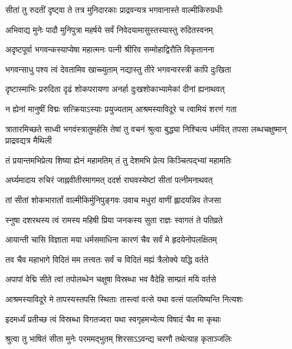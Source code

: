 
\twolineshloka
{सीतां तु रुदतीं दृष्ट्वा ते तत्र मुनिदारकाः}
{प्राद्रवन्यत्र भगवानास्ते वाल्मीकिरुग्रधीः} %

\twolineshloka
{अभिवाद्य मुनेः पादौ मुनिपुत्रा महर्षये}
{सर्वं निवेदयामासुस्तस्यास्तु रुदितस्वनम्} %

\twolineshloka
{अदृष्टपूर्वा भगवन्कस्याप्येषा महात्मनः}
{पत्नी श्रीरिव सम्मोहाद्विरौति विकृतानना} %

\twolineshloka
{भगवन्साधु पश्य त्वं देवतामिव खाच्च्युताम्}
{नद्यास्तु तीरे भगवन्वरस्त्री कापि दुःखिता} %

\twolineshloka
{दृष्टास्माभिः प्ररुदिता दृढं शोकपरायणा}
{अनर्हा दुःखशोकाभ्यामेकां दीनां ह्यनाथवत्} %

\twolineshloka
{न ह्येनां मानुषीं विद्मः सत्क्रियाऽस्याः प्रयुज्यताम्}
{आश्रमस्याविदूरे च त्वामियं शरणं गता} %

\threelineshloka
{त्रातारमिच्छते साध्वी भगवंस्त्रातुमर्हसि}
{तेषां तु वचनं श्रुत्वा बुद्ध्या निश्चित्य धर्मवित्}
{तपसा लब्धचक्षुष्मान् प्राद्रवद्यत्र मैथिली} %

\twolineshloka
{तं प्रयान्तमभिप्रेत्य शिष्या ह्येनं महामतिम्}
{तं तु देशमभि प्रेत्य किञ्चित्पद्भ्यां महामतिः} %

\twolineshloka
{अर्घ्यमादाय रुचिरं जाह्नवीतीरमागमत्}
{ददर्श राघवस्येष्टां सीतां पत्नीमनाथवत्} %

\twolineshloka
{तां सीतां शोकभारार्तां वाल्मीकिर्मुनिपुङ्गवः}
{उवाच मधुरां वाणीं ह्लादयन्निव तेजसा} %

\twolineshloka
{स्नुषा दशरथस्य त्वं रामस्य महिषी प्रिया}
{जनकस्य सुता राज्ञः स्वागतं ते पतिव्रते} %

\twolineshloka
{आयान्ती चासि विज्ञाता मया धर्मसमाधिना}
{कारणं चैव सर्वं मे हृदयेनोपलक्षितम्} %

\twolineshloka
{तव चैव महाभागे विदितं मम तत्त्वतः}
{सर्वं च विदितं मह्यं त्रैलोक्ये यद्धि वर्तते} %

\twolineshloka
{अपापां वेद्मि सीते त्वां तपोलब्धेन चक्षुषा}
{विस्रब्धा भव वैदेहि साम्प्रतं मयि वर्तसे} %

\twolineshloka
{आश्रमस्याविदूरे मे तापस्यस्तपसि स्थिताः}
{तास्त्वां वत्से यथा वत्सं पालयिष्यन्ति नित्यशः} %

\twolineshloka
{इदमर्ध्यं प्रतीच्छ त्वं विस्रब्धा विगतज्वरा}
{यथा स्वगृहमभ्येत्य विषादं चैव मा कृथाः} %

\twolineshloka
{श्रुत्वा तु भाषितं सीता मुनेः परममद्भुतम्}
{शिरसाऽऽवन्द्य चरणौ तथेत्याह कृताञ्जलिः} %

